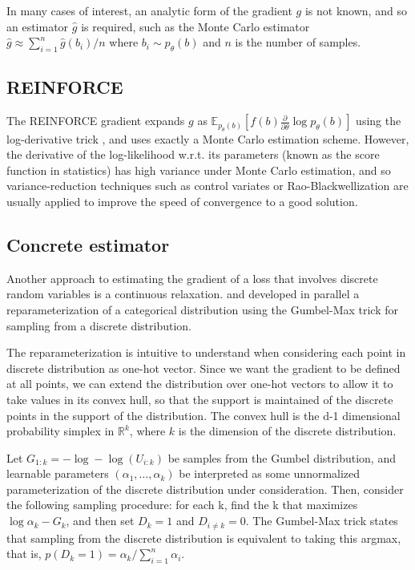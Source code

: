 \documentclass{article}
\newcommand{\discreteDist}{p_{\theta}(b)}
\newcommand{\loss}{f(b)}
\newcommand{\lossGrad}{\loss{} \frac{\partial}{\partial \theta }\log \discreteDist{}}
\newcommand{\mcGrad}{\hat{g}}
\newcommand{\expectedLossLogTrick}{\mathbb{E}_{\discreteDist{}}[\lossGrad{}]}
\begin{document}
In many cases of interest, an analytic form of the gradient $g$ is not known, and so an estimator $\mcGrad{}$ is required, such as the Monte Carlo estimator $\mcGrad{}\approx \sum_{i=1}^n\hat{g}(b_i) / n$ where $b_i\sim \discreteDist{}$ and $n$ is the number of samples. 

\subsection{REINFORCE}


The REINFORCE gradient \cite{williams1992simple} expands $g$ as $\expectedLossLogTrick{}$ using the log-derivative trick \cite{LOG DERIVITIVE TRICK}, and uses exactly a Monte Carlo estimation scheme. 
However, the derivative of the log-likelihood w.r.t. its parameters (known as the score function in statistics) has high variance under Monte Carlo estimation, and so variance-reduction techniques such as control variates or Rao-Blackwellization are usually applied to improve the speed of convergence to a good solution.

\subsection{Concrete estimator}

Another approach to estimating the gradient of a loss that involves discrete random variables is a continuous relaxation. 
\cite{maddison2016concrete} and \cite{jang2016categorical} developed in parallel a reparameterization of a categorical distribution using the Gumbel-Max trick for sampling from a discrete distribution.

The reparameterization is intuitive to understand when considering each point in discrete distribution as one-hot vector.
Since we want the gradient to be defined at all points, we can extend the distribution over one-hot vectors to allow it to take values in its convex hull, so that the support is maintained of the discrete points in the support of the distribution.
The convex hull is the d-1 dimensional probability simplex in $\mathbb{R}^k$, where $k$ is the dimension of the discrete distribution.

Let $G_{1:k} = -\log-\log(U_{i:k})$ be samples from the Gumbel distribution, and learnable parameters $(\alpha_1, \dots, \alpha_k)$ be interpreted as some unnormalized parameterization of the discrete distribution under consideration.
Then, consider the following sampling procedure: for each k, find the k that maximizes $\log \alpha_k - G_k$, and then set $D_k=1$ and $D_{i \neq k} = 0$. The Gumbel-Max trick states that sampling from the discrete distribution is equivalent to taking this argmax, that is, $p(D_k = 1) = \alpha_k / \sum_{i=1}^n \alpha_i$.
\end{document}
